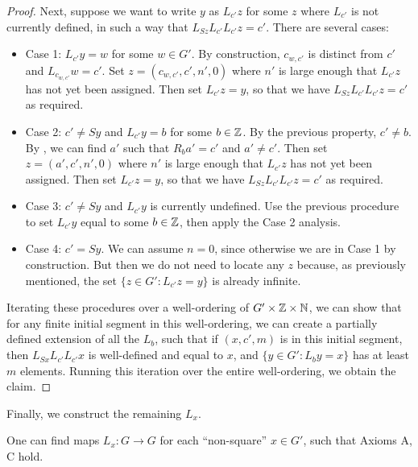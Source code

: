 \begin{proof}
Next, suppose we want to write $y$ as $L_{c'} z$ for some $z$ where $L_{c'}$ is not currently defined, in such a way that $L_{Sz} L_{c'} L_{c'} z = c'$.  There are several cases:
\begin{itemize}
\item Case 1: $L_{c'} y = w$ for some $w \in G'$.  By construction, $c_{w,c'}$ is distinct from $c'$ and $L_{c_{w,c'}} w = c'$.  Set $z = (c_{w,c'}, c', n', 0)$ where $n'$ is large enough that $L_{c'} z$ has not yet been assigned.  Then set $L_{c'} z = y$, so that we have $L_{Sz} L_{c'} L_{c'} z = c'$ as required.
\item Case 2: $c' \neq Sy$ and $L_{c'} y = b$ for some $b \in \mathbb{Z}$. By the previous property, $c' \neq b$.  By , we can find $a'$ such that $R_b a' = c'$ and $a' \neq c'$.  Then set $z = (a', c', n', 0)$ where $n'$ is large enough that $L_{c'} z$ has not yet been assigned.  Then set $L_{c'} z = y$, so that we have $L_{Sz} L_{c'} L_{c'} z = c'$ as required.
\item Case 3: $c' \neq Sy$ and $L_{c'} y$ is currently undefined.  Use the previous procedure to set $L_{c'} y$ equal to some $b \in \mathbb{Z}$, then apply the Case 2 analysis.
\item Case 4: $c' = Sy$.  We can assume $n=0$, since otherwise we are in Case 1 by construction.  But then we do not need to locate any $z$ because, as previously mentioned, the set $\{ z \in G': L_{c'} z = y \}$ is already infinite.
\end{itemize}

Iterating these procedures over a well-ordering of $G' \times \mathbb{Z} \times \mathbb{N}$, we can show that for any finite initial segment in this well-ordering, we can create a partially defined extension of all the $L_b$, such that if $(x,c',m)$ is in this initial segment, then $L_{Sx} L_{c'} L_{c'} x$ is well-defined and equal to $x$,  and $\{ y \in G': L_b y = x \}$ has at least $m$ elements.  Running this iteration over the entire well-ordering, we obtain the claim.
\end{proof}

Finally, we construct the remaining $L_x$.

\begin{proposition}\label{axiom-c} One can find maps $L_x: G \to G$ for each ``non-square'' $x \in G'$, such that Axioms A, C hold.
\end{proposition}

